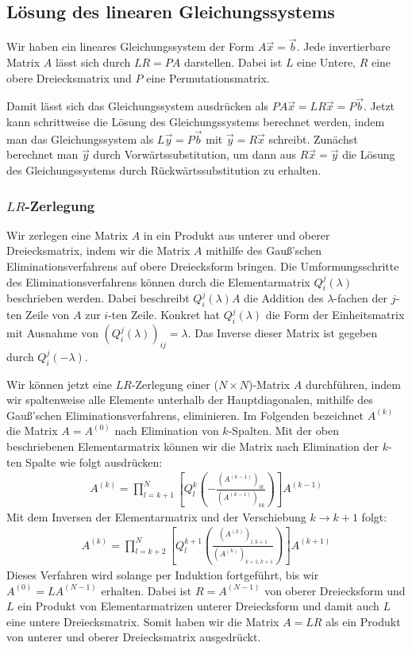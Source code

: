 \documentclass[10pt,a4paper]{article}
\begin{document}
\subsection{Lösung des linearen Gleichungssystems}
Wir haben ein lineares Gleichungssystem der Form $A\vec{x} = \vec{b}$. Jede invertierbare Matrix $A$ lässt sich durch $LR = PA$ darstellen. Dabei ist $L$ eine Untere, $R$ eine obere Dreiecksmatrix und $P$ eine Permutationsmatrix.

Damit lässt sich das Gleichungssystem ausdrücken als $PA\vec{x} = LR\vec{x} = P\vec{b}$. Jetzt kann schrittweise die Lösung des Gleichungssystems berechnet werden, indem man das Gleichungssystem als $L\vec{y} = P\vec{b}$ mit $\vec{y} = R\vec{x}$ schreibt. Zunächst berechnet man $\vec{y}$ durch Vorwärtssubstitution, um dann aus $R\vec{x} = \vec{y}$ die Lösung des Gleichungssystems durch Rückwärtssubstitution zu erhalten.

\subsubsection{$LR$-Zerlegung}
\label{lr-zerlegung}
Wir zerlegen eine Matrix $A$ in ein Produkt aus unterer und oberer Dreiecksmatrix, indem wir die Matrix $A$ mithilfe des Gauß'schen Eliminationsverfahrens auf obere Dreiecksform bringen. Die Umformungsschritte des Eliminationsverfahrens können durch die Elementarmatrix $Q^j_i(\lambda)$ beschrieben werden. Dabei beschreibt $Q^j_i (\lambda) A$ die Addition des $\lambda$-fachen der $j$-ten Zeile von $A$ zur $i$-ten Zeile. Konkret hat $Q^j_i (\lambda)$ die Form der Einheitsmatrix mit Ausnahme von $\left(Q^j_i (\lambda) \right)_{ij} = \lambda$. Das Inverse dieser Matrix ist gegeben durch $Q^j_i (-\lambda)$.

Wir können jetzt eine $LR$-Zerlegung einer ($N \times N$)-Matrix $A$ durchführen, indem wir spaltenweise alle Elemente unterhalb der Hauptdiagonalen, mithilfe des Gauß'schen Eliminationsverfahrens, eliminieren. Im Folgenden bezeichnet $A^{(k)}$ die Matrix $A = A^{(0)}$ nach Elimination von $k$-Spalten. Mit der oben beschriebenen Elementarmatrix können wir die Matrix nach Elimination der $k$-ten Spalte wie folgt ausdrücken:
\begin{align}
	A^{(k)} = \prod_{l=k+1}^N \left[ Q^{k}_l \left( -\frac{(A^{(k-1)})_{lk}}{(A^{(k-1)})_{kk}}\right)\right] A^{(k-1)} 
\end{align}
Mit dem Inversen der Elementarmatrix und der Verschiebung $k \rightarrow k + 1$ folgt:
\begin{align}
	A^{(k)} = \prod_{l=k+2}^N \left[ Q^{k+1}_l \left( \frac{(A^{(k)})_{l,k+1}}{(A^{(k)})_{k+1,k+1}}\right)\right]  A^{(k+1)}
\end{align}
Dieses Verfahren wird solange per Induktion fortgeführt, bis wir $A^{(0)} = L A^{(N-1)}$ erhalten. Dabei ist $R = A^{(N-1)}$ von oberer Dreiecksform und $L$ ein Produkt von Elementarmatrizen unterer Dreiecksform und damit auch $L$ eine untere Dreiecksmatrix. Somit haben wir die Matrix $A = L R$ als ein Produkt von unterer und oberer Dreiecksmatrix ausgedrückt.
\end{document}
